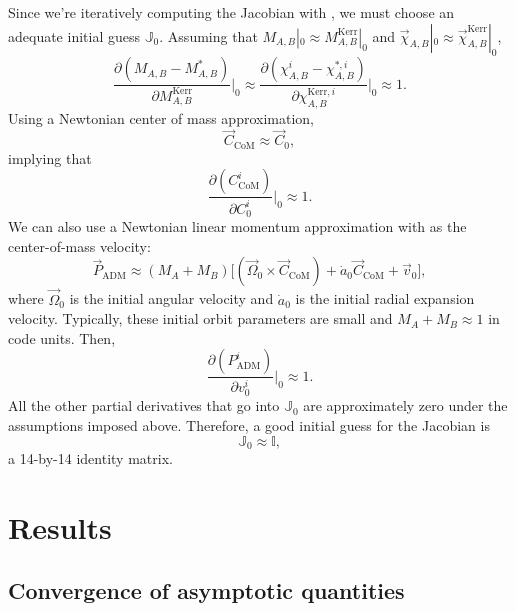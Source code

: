 \documentclass{../document}
\begin{document}
      Since we're iteratively computing the Jacobian with \eq{\eqref{eq:J-iteration}}, we must choose an adequate initial guess $\mathbb{J}_0$. Assuming that $M_{A,B}|_0 \approx M^\text{Kerr}_{A,B}|_0$ and $\vec\chi_{A,B}|_0 \approx \vec\chi^\text{Kerr}_{A,B}|_0$,
      \begin{equation}
        \frac{\partial (M_{A,B} - M^*_{A,B})}{\partial M^\text{Kerr}_{A,B}}\Bigg|_0
        \approx \frac{\partial (\chi^i_{A,B} - \chi^{*,i}_{A,B})}{\partial \chi^{\text{Kerr},i}_{A,B}}\Bigg|_0
        \approx 1.
      \end{equation}
      Using a Newtonian center of mass approximation,
      \begin{equation}
        \vec C_\text{CoM} \approx \vec C_0,
      \end{equation}
      implying that
      \begin{equation}
        \frac{\partial (C_\text{CoM}^i)}{\partial C_0^i}\Bigg|_0 \approx 1.
      \end{equation}
      We can also use a Newtonian linear momentum approximation with \eq{\eqref{eq:shift-boundary-condition}} as the center-of-mass velocity:
      \begin{equation}
        \vec P_\text{ADM} \approx (M_A + M_B) \Big[ (\vec \Omega_0 \times \vec C_\text{CoM}) + \dot a_0 \vec C_\text{CoM} + \vec v_0 \Big],
      \end{equation}
      where $\vec \Omega_0$ is the initial angular velocity and $\dot a_0$ is the initial radial expansion velocity. Typically, these initial orbit parameters are small and $M_A + M_B \approx 1$ in code units. Then,
      \begin{equation}
        \frac{\partial (P_\text{ADM}^i)}{\partial v_0^i}\Bigg|_0 \approx 1.
      \end{equation}
      All the other partial derivatives that go into $\mathbb{J}_0$ are approximately zero under the assumptions imposed above. Therefore, a good initial guess for the Jacobian is
      \begin{equation}
        \mathbb{J}_0 \approx \mathbb{I},
      \end{equation}
      a 14-by-14 identity matrix.
    
  \section{Results}

    \subsection{Convergence of asymptotic quantities}
\end{document}
